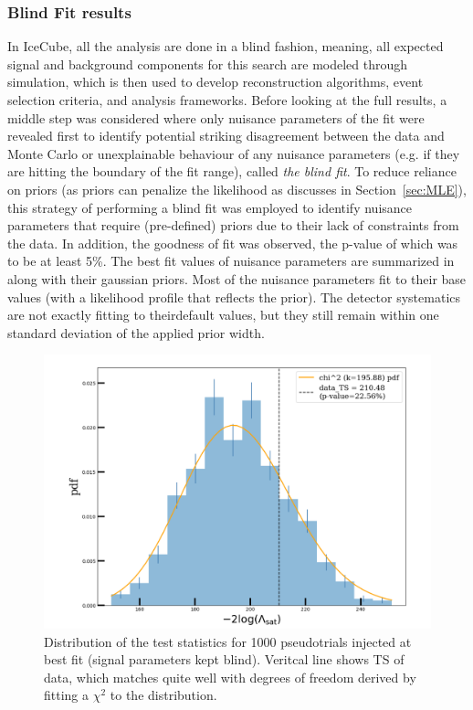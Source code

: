 \subsubsection{Blind Fit results}
\label{blindfit}
In IceCube, all the analysis are done in a blind fashion, meaning, all expected signal and background components for this search are modeled through simulation, which is then used to develop reconstruction algorithms, event selection criteria, and analysis frameworks. Before looking at the full results, a middle step was considered where only nuisance parameters of the fit were revealed first to identify potential striking disagreement between the data and Monte Carlo or unexplainable behaviour of any nuisance parameters (e.g. if they are hitting the boundary of the fit range), called \emph{the blind fit}. To reduce reliance on priors (as priors can penalize the likelihood as discusses in Section~\ref{sec:MLE}), this strategy of performing a blind fit was employed to identify nuisance parameters that require (pre-defined) priors due to their lack of constraints from the data. In addition, the goodness of fit was observed, the p-value of which was to be at least 5\%. The best fit values of nuisance parameters are summarized in  along with their gaussian priors. Most of the nuisance parameters fit to their base values (with a likelihood profile that reflects the prior). The detector systematics are not exactly fitting to theirdefault values, but they still remain within one standard deviation of the applied prior width.

\begin{figure}[ht]
	\includegraphics[scale=0.5]{./figures/results/GOF.pdf}
	\caption{Distribution of the test statistics for 1000 pseudotrials injected at best fit (signal parameters kept blind). Veritcal line shows TS of data, which matches quite well with degrees of freedom derived by fitting a $\chi^2$ to the distribution.}
\end{figure}

